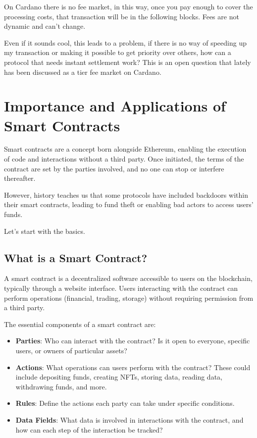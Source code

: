 On Cardano there is no fee market, in this way, once you pay enough to cover the processing costs, that transaction will be in the following blocks. Fees are not dynamic and can't change.

Even if it sounds cool, this leads to a problem, if there is no way of speeding up my transaction or making it possible to get priority over others, how can a protocol that needs instant settlement work?
This is an open question that lately has been discussed as a tier fee market on Cardano.

\newpage


\section{Importance and Applications of Smart Contracts}

Smart contracts are a concept born alongside Ethereum, enabling the execution of code and interactions without a third party. Once initiated, the terms of the contract are set by the parties involved, and no one can stop or interfere thereafter.

However, history teaches us that some protocols have included backdoors within their smart contracts, leading to fund theft or enabling bad actors to access users' funds.

Let's start with the basics.

\subsection{What is a Smart Contract?}

A smart contract is a decentralized software accessible to users on the blockchain, typically through a website interface. Users interacting with the contract can perform operations (financial, trading, storage) without requiring permission from a third party.

The essential components of a smart contract are:

\begin{itemize}
  \item \textbf{Parties}: Who can interact with the contract? Is it open to everyone, specific users, or owners of particular assets?
  \item \textbf{Actions}: What operations can users perform with the contract? These could include depositing funds, creating NFTs, storing data, reading data, withdrawing funds, and more.
  \item \textbf{Rules}: Define the actions each party can take under specific conditions.
  \item \textbf{Data Fields}: What data is involved in interactions with the contract, and how can each step of the interaction be tracked?
\end{itemize}
